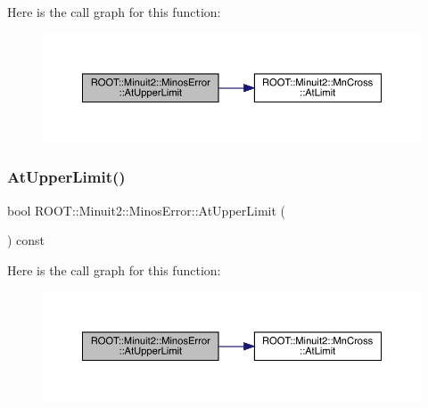 Here is the call graph for this function\+:
\nopagebreak
\begin{figure}[H]
\begin{center}
\leavevmode
\includegraphics[width=350pt]{d2/dd1/classROOT_1_1Minuit2_1_1MinosError_a6c8a60e5b855f9d7164f441ea69c75eb_cgraph}
\end{center}
\end{figure}
\mbox{\label{classROOT_1_1Minuit2_1_1MinosError_a6c8a60e5b855f9d7164f441ea69c75eb}} 
\subsubsection{\texorpdfstring{AtUpperLimit()}{AtUpperLimit()}\hspace{0.1cm}{\footnotesize\ttfamily [3/3]}}
{\footnotesize\ttfamily bool R\+O\+O\+T\+::\+Minuit2\+::\+Minos\+Error\+::\+At\+Upper\+Limit (\begin{DoxyParamCaption}{ }\end{DoxyParamCaption}) const\hspace{0.3cm}{\ttfamily [inline]}}

Here is the call graph for this function\+:
\nopagebreak
\begin{figure}[H]
\begin{center}
\leavevmode
\includegraphics[width=350pt]{d2/dd1/classROOT_1_1Minuit2_1_1MinosError_a6c8a60e5b855f9d7164f441ea69c75eb_cgraph}
\end{center}
\end{figure}
\mbox{\label{classROOT_1_1Minuit2_1_1MinosError_a940c974f6ac87d22c4d340ef2fc88e8c}} 
